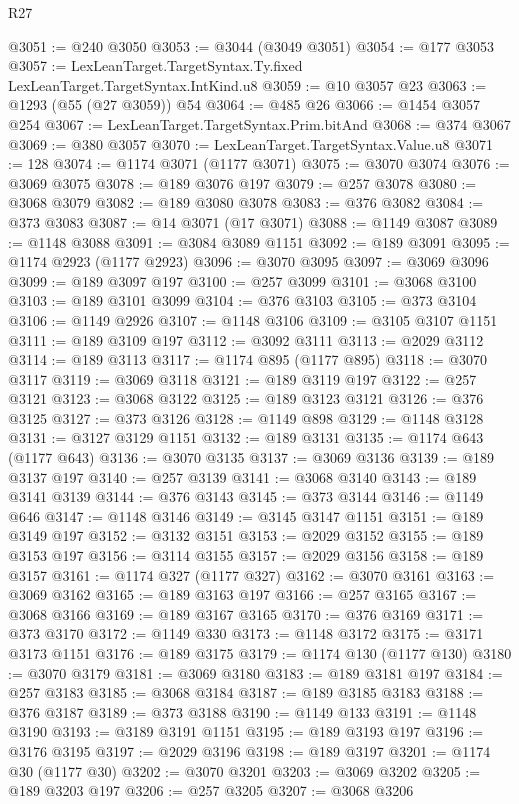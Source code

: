 \begin{lexlean}{R27}
\begin{coremodule}
@3051 := @240 @3050
@3053 := @3044 (@3049 @3051)
@3054 := @177 @3053
@3057 := LexLeanTarget.TargetSyntax.Ty.fixed LexLeanTarget.TargetSyntax.IntKind.u8
@3059 := @10 @3057 @23
@3063 := @1293 (@55 (@27 @3059)) @54
@3064 := @485 @26
@3066 := @1454 @3057 @254
@3067 := LexLeanTarget.TargetSyntax.Prim.bitAnd
@3068 := @374 @3067
@3069 := @380 @3057
@3070 := LexLeanTarget.TargetSyntax.Value.u8
@3071 := 128
@3074 := @1174 @3071 (@1177 @3071)
@3075 := @3070 @3074
@3076 := @3069 @3075
@3078 := @189 @3076 @197
@3079 := @257 @3078
@3080 := @3068 @3079
@3082 := @189 @3080 @3078
@3083 := @376 @3082
@3084 := @373 @3083
@3087 := @14 @3071 (@17 @3071)
@3088 := @1149 @3087
@3089 := @1148 @3088
@3091 := @3084 @3089 @1151
@3092 := @189 @3091
@3095 := @1174 @2923 (@1177 @2923)
@3096 := @3070 @3095
@3097 := @3069 @3096
@3099 := @189 @3097 @197
@3100 := @257 @3099
@3101 := @3068 @3100
@3103 := @189 @3101 @3099
@3104 := @376 @3103
@3105 := @373 @3104
@3106 := @1149 @2926
@3107 := @1148 @3106
@3109 := @3105 @3107 @1151
@3111 := @189 @3109 @197
@3112 := @3092 @3111
@3113 := @2029 @3112
@3114 := @189 @3113
@3117 := @1174 @895 (@1177 @895)
@3118 := @3070 @3117
@3119 := @3069 @3118
@3121 := @189 @3119 @197
@3122 := @257 @3121
@3123 := @3068 @3122
@3125 := @189 @3123 @3121
@3126 := @376 @3125
@3127 := @373 @3126
@3128 := @1149 @898
@3129 := @1148 @3128
@3131 := @3127 @3129 @1151
@3132 := @189 @3131
@3135 := @1174 @643 (@1177 @643)
@3136 := @3070 @3135
@3137 := @3069 @3136
@3139 := @189 @3137 @197
@3140 := @257 @3139
@3141 := @3068 @3140
@3143 := @189 @3141 @3139
@3144 := @376 @3143
@3145 := @373 @3144
@3146 := @1149 @646
@3147 := @1148 @3146
@3149 := @3145 @3147 @1151
@3151 := @189 @3149 @197
@3152 := @3132 @3151
@3153 := @2029 @3152
@3155 := @189 @3153 @197
@3156 := @3114 @3155
@3157 := @2029 @3156
@3158 := @189 @3157
@3161 := @1174 @327 (@1177 @327)
@3162 := @3070 @3161
@3163 := @3069 @3162
@3165 := @189 @3163 @197
@3166 := @257 @3165
@3167 := @3068 @3166
@3169 := @189 @3167 @3165
@3170 := @376 @3169
@3171 := @373 @3170
@3172 := @1149 @330
@3173 := @1148 @3172
@3175 := @3171 @3173 @1151
@3176 := @189 @3175
@3179 := @1174 @130 (@1177 @130)
@3180 := @3070 @3179
@3181 := @3069 @3180
@3183 := @189 @3181 @197
@3184 := @257 @3183
@3185 := @3068 @3184
@3187 := @189 @3185 @3183
@3188 := @376 @3187
@3189 := @373 @3188
@3190 := @1149 @133
@3191 := @1148 @3190
@3193 := @3189 @3191 @1151
@3195 := @189 @3193 @197
@3196 := @3176 @3195
@3197 := @2029 @3196
@3198 := @189 @3197
@3201 := @1174 @30 (@1177 @30)
@3202 := @3070 @3201
@3203 := @3069 @3202
@3205 := @189 @3203 @197
@3206 := @257 @3205
@3207 := @3068 @3206

\end{coremodule}
\end{lexlean}
